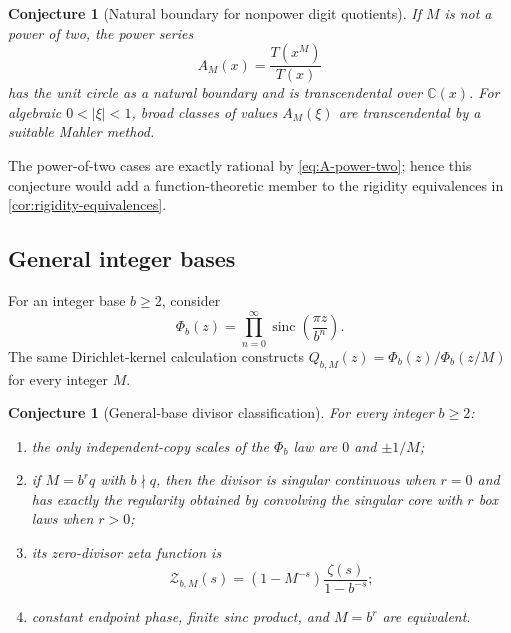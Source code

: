 \documentclass[11pt,oneside]{article}
\newtheorem{conjecture}[theorem]{Conjecture}
\theoremstyle{definition}
\theoremstyle{remark}
\newcommand{\sinc}{\operatorname{sinc}}
\numberwithin{equation}{section}
\newcommand{\1}{\mathbf 1}
\begin{document}
\begin{conjecture}[Natural boundary for nonpower digit quotients]
\label{conj:natural-boundary}
If $M$ is not a power of two, the power series
\begin{equation}
 A_M(x)=\frac{T(x^M)}{T(x)}
 \label{eq:AM-quotient-conj}
\end{equation}
has the unit circle as a natural boundary and is transcendental over $\mathbb C(x)$.  For
algebraic $0<|\xi|<1$, broad classes of values $A_M(\xi)$ are transcendental by a suitable
Mahler method.
\end{conjecture}

The power-of-two cases are exactly rational by \eqref{eq:A-power-two}; hence this conjecture
would add a function-theoretic member to the rigidity equivalences in
\cref{cor:rigidity-equivalences}.

\subsection{General integer bases}

For an integer base $b\ge2$, consider
\begin{equation}
 \Phi_b(z)=\prod_{n=0}^{\infty}\sinc\!\left(\frac{\pi z}{b^n}\right).
 \label{eq:Phi-b}
\end{equation}
The same Dirichlet-kernel calculation constructs
$Q_{b,M}(z)=\Phi_b(z)/\Phi_b(z/M)$ for every integer $M$.

\begin{conjecture}[General-base divisor classification]
\label{conj:general-base}
For every integer $b\ge2$:
\begin{enumerate}
\item the only independent-copy scales of the $\Phi_b$ law are $0$ and $\pm1/M$;
\item if $M=b^rq$ with $b\nmid q$, then the divisor is singular continuous when $r=0$
and has exactly the regularity obtained by convolving the singular core with $r$ box laws
when $r>0$;
\item its zero-divisor zeta function is
\begin{equation}
 \mathcal Z_{b,M}(s)=(1-M^{-s})\frac{\zeta(s)}{1-b^{-s}};
 \label{eq:general-base-zeta}
\end{equation}
\item constant endpoint phase, finite sinc product, and $M=b^r$ are equivalent.
\end{enumerate}
\end{conjecture}
\end{document}
